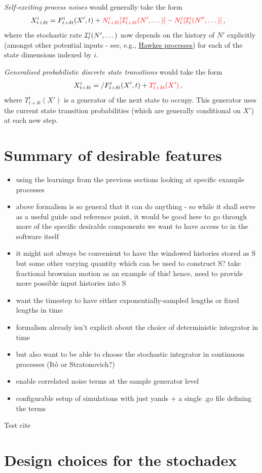 \documentclass[sts]{imsart}
\begin{document}
\emph{Self-exciting process noises} would generally take the form
\begin{align}
& X^i_{t+\delta t} = F^i_{t+\delta t}(X', t) + \textcolor{red}{N^i_{t+\delta t}[{\cal I}^i_{t+\delta t}(N', \dots)]-N^i_{t}[{\cal I}^i_{t}(N'', \dots)]}\,,
\end{align}
where the stochastic rate ${\cal I}^i_{t}(N', \dots)$ now depends on the history of $N'$ explicitly (amongst other potential inputs - see, e.g., \href{https://en.wikipedia.org/wiki/Hawkes_process}{Hawkes processes}) for each of the state dimensions indexed by $i$.

\emph{Generalised probabilistic discrete state transitions} would take the form
\begin{align}
& X^i_{t+\delta t} = \slash{F^i_{t+\delta t}(X', t)} + \textcolor{red}{T^i_{t+\delta t}(X')}\,,
\end{align}
where $T^i_{t+\delta t}(X')$ is a generator of the next state to occupy. This generator uses the current state transition probabilities (which are generally conditional on $X'$) at each new step.

\section*{Summary of desirable features}

\begin{itemize}
\item{using the learnings from the previous sections looking at specific example processes}
\item{above formalism is so general that it can do anything - so while it shall serve as a useful guide and reference point, it would be good here to go through more of the specific desirable components we want to have access to in the software itself}
\item{it might not always be convenient to have the windowed histories stored as S but some other varying quantity which can be used to construct S? take fractional brownian motion as an example of this! hence, need to provide more possible input histories into S}
\item{want the timestep to have either exponentially-sampled lengths or fixed lengths in time}
\item{formalism already isn't explicit about the choice of deterministic integrator in time}
\item{but also want to be able to choose the stochastic integrator in continuous processes (Itô or Stratonovich?)}
\item{enable correlated noise terms at the sample generator level}
\item{configurable setup of simulations with just yamls + a single .go file defining the terms}
\end{itemize}


Test cite~\cite{Dimastrogiovanni:2018xnn}

\section*{Design choices for the stochadex}




\end{document}
